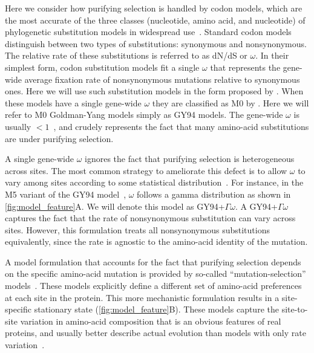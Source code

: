 \documentclass[11pt]{article}
\begin{document}
Here we consider how purifying selection is handled by codon models, which are the most accurate of the three classes (nucleotide, amino acid, and nucleotide) of phylogenetic substitution models in widespread use~\citep{arenas2015trends}.
Standard codon models distinguish between two types of substitutions: synonymous and nonsynonymous.
The relative rate of these substitutions is referred to as dN/dS or $\omega$.
In their simplest form, codon substitution models fit a single $\omega$ that represents the gene-wide average fixation rate of nonsynonymous mutations relative to synonymous ones.
Here we will use such substitution models in the form proposed by \citet{goldman1994codon}.
When these models have a single gene-wide $\omega$ they are classified as M0 by \citet{yang2000codon}.
Here we will refer to M0 Goldman-Yang models simply as GY94 models. 
The gene-wide $\omega$ is usually $<1$~\citep{murrell2015gene}, and crudely represents the fact that many amino-acid substitutions are under purifying selection.

A single gene-wide $\omega$ ignores the fact that purifying selection is heterogeneous across sites.
The most common strategy to ameliorate this defect is to allow $\omega$ to vary among sites according to some statistical distribution~\citep{yang1994maximum,yang2000codon}.
For instance, in the M5 variant of the GY94 model~\citep{yang2000codon}, $\omega$ follows a gamma distribution as shown in \ref{fig:model_feature}A.
We will denote this model as GY94+$\Gamma\omega$.
A GY94+$\Gamma\omega$ captures the fact that the rate of nonsynonymous substitution can vary across sites. 
However, this formulation treats all nonsynonymous substitutions equivalently, since the rate is agnostic to the amino-acid identity of the mutation. 

A model formulation that accounts for the fact that purifying selection depends on the specific amino-acid mutation is provided by so-called ``mutation-selection'' models~\citep{halpern1998evolutionary,yang2008mutation,rodrigue2010mutation,tamuri2012estimating,mccandlish2014modeling}.
These models explicitly define a different set of amino-acid preferences at each site in the protein. 
This more mechanistic formulation results in a site-specific stationary state (\ref{fig:model_feature}B). 
These models capture the site-to-site variation in amino-acid composition that is an obvious features of real proteins, and usually better describe actual evolution than models with only rate variation~\citep{lartillot2004bayesian, le2008phylogenetic, rodrigue2010mutation,hilton2017phydms,bloom2014experimentally}.
\end{document}
